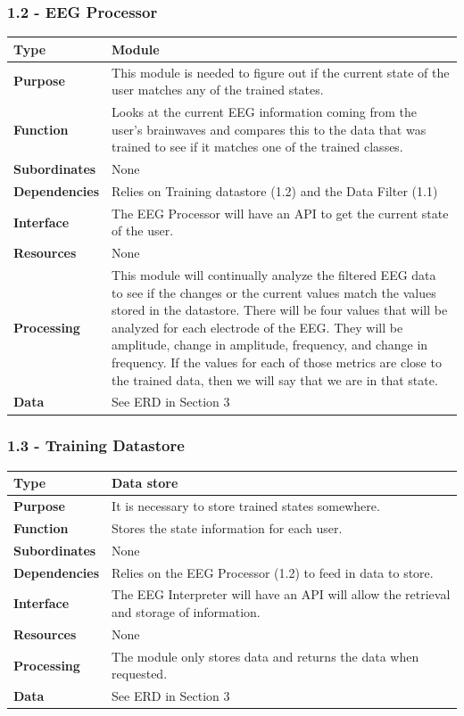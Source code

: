 \documentclass{article}
\begin{document}
\subsubsection*{1.2 - EEG Processor}
\begin{tabular}{ | l |  p{13.3cm} |}
\hline
\textbf{Type} & Module \\ \hline
\textbf{Purpose} & This module is needed to figure out if the current state of the user matches any of the trained states. \\ \hline
\textbf{Function} & Looks at the current EEG information coming from the user's brainwaves and compares this to the data that was trained to see if it matches one of the trained classes. \\ \hline
\textbf{Subordinates} & None \\ \hline
\textbf{Dependencies} & Relies on Training datastore (1.2) and the Data Filter (1.1) \\ \hline
\textbf{Interface} & The EEG Processor will have an API to get the current state of the user. \\ \hline
\textbf{Resources} & None \\ \hline
\textbf{Processing} & This module will continually analyze the filtered EEG data to see if the changes or the current values match the values stored in the datastore. There will be four values that will be analyzed for each electrode of the EEG. They will be amplitude, change in amplitude, frequency, and change in frequency. If the values for each of those metrics are close to the trained data, then we will say that we are in that state.\\ \hline
\textbf{Data} & See ERD in Section 3 \\ \hline
\end{tabular}

\subsubsection*{1.3 - Training Datastore}
\begin{tabular}{ | l |  p{13.3cm} |}
\hline
\textbf{Type} & Data store \\ \hline
\textbf{Purpose} & It is necessary to store trained states somewhere. \\ \hline
\textbf{Function} & Stores the state information for each user.\\ \hline
\textbf{Subordinates} & None \\ \hline
\textbf{Dependencies} & Relies on the EEG Processor (1.2) to feed in data to store. \\ \hline
\textbf{Interface} & The EEG Interpreter will have an API will allow the retrieval and storage of information. \\ \hline
\textbf{Resources} & None \\ \hline
\textbf{Processing} & The module only stores data and returns the data when requested.\\ \hline
\textbf{Data} & See ERD in Section 3 \\ \hline
\end{tabular}
\end{document}
